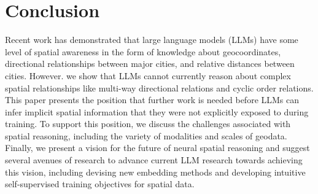 \section{Conclusion}
\label{section:conclusion}
\normalsize


Recent work has demonstrated that large language models (LLMs) have some level of spatial awareness in the form of knowledge about geocoordinates, directional relationships between major cities, and relative distances between cities.
%
However. we show that LLMs cannot currently reason about complex spatial relationships like multi-way directional relations and cyclic order relations. %
%
This paper presents the position that further work is needed before LLMs can infer implicit spatial information that they were not explicitly exposed to during training.
%
To support this position, we discuss the challenges associated with spatial reasoning, including the variety of modalities and scales of geodata.
%
Finally, we present a vision for the future of neural spatial reasoning and suggest several avenues of research to advance current LLM research towards achieving this vision, including devising new embedding methods and developing intuitive self-supervised training objectives for spatial data.